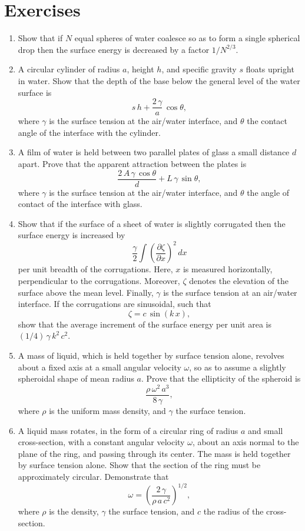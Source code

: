 \section{Exercises}
{\small 
\renewcommand{\theenumi}{4.\arabic{enumi}}
\begin{enumerate}
\item Show that if $N$ equal spheres of water coalesce so as to form a single spherical drop then the
surface energy is decreased by a factor $1/N^{2/3}$. 
\item A circular cylinder of radius $a$, height $h$, and specific gravity $s$ floats upright in water. Show
that the depth of the base below the general level of the water surface is
$$
s\,h + \frac{2\,\gamma}{a}\,\cos\theta,
$$
where $\gamma$ is the surface tension at the air/water interface, and $\theta$ the contact angle of the
interface with the cylinder. 

\item A film of water is held between two parallel plates of glass a small distance $d$ apart. Prove
that the apparent attraction between the plates is
$$
\frac{2\,A\,\gamma\,\cos\theta}{d} + L\,\gamma\,\sin\theta,
$$
where $\gamma$ is the surface tension at the air/water interface, and $\theta$ the angle of contact of the
interface with glass.

\item Show that if the surface of a sheet of water is slightly corrugated then the surface energy is
increased by
$$
\frac{\gamma}{2}\int \left(\frac{\partial \zeta}{\partial x}\right)^2\,dx
$$
per unit breadth of the corrugations. Here, $x$ is measured horizontally, perpendicular to the corrugations. 
Moreover, $\zeta$ denotes the elevation of the surface above the mean level. Finally, $\gamma$ is the
surface tension at an air/water interface.  If the corrugations are sinusoidal, such that
$$
\zeta = c\,\sin(k\,x),
$$
show that the average increment of the surface energy per unit area is $(1/4)\,\gamma\,k^2\,c^2$.

\item A mass of liquid, which is held together by surface tension alone, revolves about a
fixed axis at a small angular velocity $\omega$, so as to assume a slightly spheroidal shape of
mean radius $a$. Prove that the ellipticity of the spheroid is 
$$
\frac{\rho\,\omega^2\,a^3}{8\,\gamma},
$$
where $\rho$ is the uniform mass density, and $\gamma$ the surface tension.

\item A liquid mass rotates, in the form of a circular ring of radius $a$ and small cross-section, with a constant angular
velocity $\omega$, about an axis normal to the plane of the ring, and passing through its center. The mass is
held together by surface tension alone. Show that the section of the ring must be approximately circular. 
Demonstrate that
$$
\omega = \left(\frac{2\,\gamma}{\rho\,a\,c^2}\right)^{1/2},
$$
where $\rho$ is the density, $\gamma$ the surface tension, and $c$ the radius of the cross-section.


\end{enumerate}}
